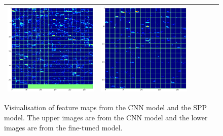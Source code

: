 \begin{figure}[!htb]
\begin{center}
\begin{tabular}{|c|c|c|c|c|c|}
\includegraphics[scale=0.1]{sunny2_conv4_fm.png} &
\includegraphics[scale=0.1]{sunny2_conv5_fm.png}\\ \hline\hline
\end{tabular}

\end{center}
	\caption{Visiualisation of feature maps from the CNN model and the SPP model. The upper images are from the CNN model and the lower images are from the fine-tuned model.}
	\label{fig:diff_featuremap}%
\end{figure}


